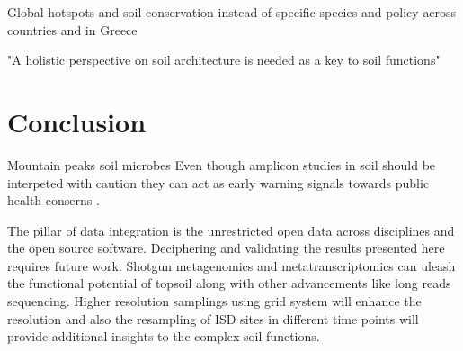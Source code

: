 \documentclass[unnumsec,webpdf,contemporary,large]{oup-authoring-template}%
\theoremstyle{thmstyleone}%
\theoremstyle{thmstyletwo}%
\theoremstyle{thmstylethree}%
\begin{document}
Global hotspots \cite{Guerra2022}
and soil conservation instead of specific species \cite{Guerra2021}
and policy \cite{KONINGER2022} across countries \cite{Putten2023} and in Greece \cite{SCHISMENOS2022100035}

"A holistic perspective on soil architecture is needed as a key to soil functions" \cite{philippot2024the-interplay}
\section{Conclusion}

Mountain peaks soil microbes \cite{Adamczyk2019}
Even though amplicon studies in soil should be interpeted with caution \cite{alteio2021} they 
can act as early warning signals towards public health conserns \cite{Banerjee2023}.

The pillar of data integration is the unrestricted open data across disciplines and 
the open source software.
Deciphering and validating the results presented here requires future work.
Shotgun metagenomics and metatranscriptomics can uleash the functional potential of
topsoil along with other advancements like long reads sequencing. Higher resolution
samplings using grid system will enhance the resolution and also the resampling of
ISD sites in different time points will provide additional insights to the complex soil 
functions.



\end{document}
